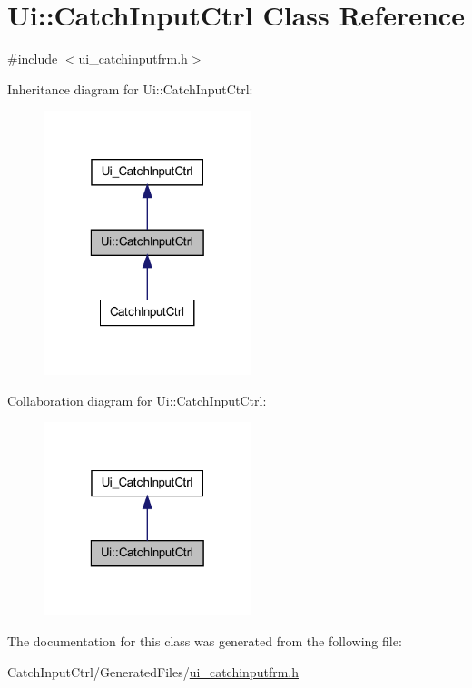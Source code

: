 \hypertarget{class_ui_1_1_catch_input_ctrl}{
\section{Ui::CatchInputCtrl Class Reference}
\label{class_ui_1_1_catch_input_ctrl}
}


{\ttfamily \#include $<$ui\_\-catchinputfrm.h$>$}



Inheritance diagram for Ui::CatchInputCtrl:\nopagebreak
\begin{figure}[H]
\begin{center}
\leavevmode
\includegraphics[width=172pt]{class_ui_1_1_catch_input_ctrl__inherit__graph}
\end{center}
\end{figure}


Collaboration diagram for Ui::CatchInputCtrl:\nopagebreak
\begin{figure}[H]
\begin{center}
\leavevmode
\includegraphics[width=172pt]{class_ui_1_1_catch_input_ctrl__coll__graph}
\end{center}
\end{figure}


The documentation for this class was generated from the following file:\begin{DoxyCompactItemize}
\item 
CatchInputCtrl/GeneratedFiles/\hyperlink{ui__catchinputfrm_8h}{ui\_\-catchinputfrm.h}\end{DoxyCompactItemize}
